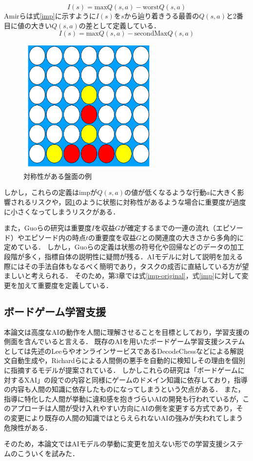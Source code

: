 \begin{equation}
	\label{imp-original}
	{I(s)= \textrm{max}Q(s, a)-\textrm{worst}Q(s, a)}
\end{equation}
Amirらは式\ref{imp}に示すように$I(s)$を$s$から辿り着きうる最善の$Q(s, a)$と2番目に値の大きい$Q(s, a)$の差として定義している．
\begin{equation}
    \label{imp}
	{I(s)= \textrm{max}Q(s, a)-\textrm{secondMax}Q(s, a)}
\end{equation}
\begin{figure}[htbp]
	\centering
	\includegraphics[width=200pt]{./figure/symmetry.png}
	\caption{対称性がある盤面の例}
	\label{fig:symmetry}
\end{figure}
しかし，これらの定義はimpが$Q(s, a)$の値が低くなるような行動$a$に大きく影響されるリスクや，図\ref{fig:symmetry}のように状態に対称性があるような場合に重要度が過度に小さくなってしまうリスクがある．

また，Guoらの研究\cite{EDGE}は重要度$I$を収益$G$が確定するまでの一連の流れ（エピソード）やエピソード内の時点$t$の重要度を収益$G$との関連度の大きさから多角的に定めている．
しかし，Guoらの定義は状態の符号化や回帰などのデータの加工段階が多く，指標自体の説明性に疑問が残る．AIモデルに対して説明を加える際にはその手法自体もなるべく簡明であり，タスクの成否に直結している方が望ましいと考えられる．
そのため，第3章では式\ref{imp-original}，式\ref{imp}に対して変更を加えて重要度を定義している．



\subsection{ボードゲーム学習支援}
本論文は高度なAIの動作を人間に理解させることを目標としており，学習支援の側面を含んでいると言える．
既存のAIを用いたボードゲーム学習支援システムとしては先述のLeeら\cite{ChessComments}やオンラインサービスであるDecodeChess\cite{DecodeChess}などによる解説文自動生成や，Richardら\cite{badMoves2016}\cite{badMoves2017}による人間側の悪手を自動的に検知しその理由を個別に指摘するモデルが提案されている．
しかしこれらの研究は「ボードゲームに対するXAI」の段での内容と同様にゲームのドメイン知識に依存しており，指導の内容も人間の知識に依存したものになってしまうという欠点がある．
また，指導に特化した人間が挙動に違和感を抱きづらいAIの開発も行われている\cite{natural}\cite{maia}が，このアプローチは人間が受け入れやすい方向にAIの側を変更する方式であり，その変更により既存の人間の知識ではとらえられないAIの強みが失われてしまう危険性がある．


そのため，本論文ではAIモデルの挙動に変更を加えない形での学習支援システムのこういくを試みた．